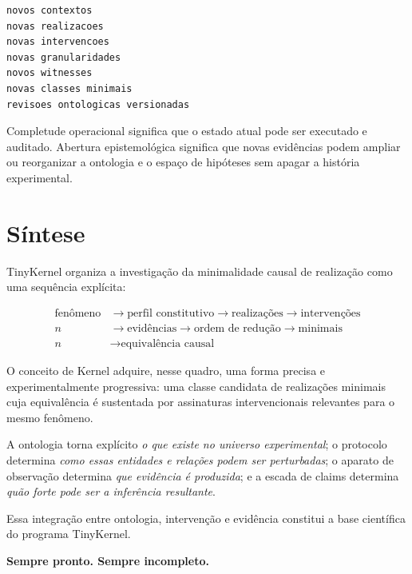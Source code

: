 \documentclass[11pt,a4paper]{article}
\begin{document}
\begin{lstlisting}
novos contextos
novas realizacoes
novas intervencoes
novas granularidades
novos witnesses
novas classes minimais
revisoes ontologicas versionadas
\end{lstlisting}

\begin{thesisbox}
Completude operacional significa que o estado atual pode ser executado e auditado.
Abertura epistemológica significa que novas evidências podem ampliar ou reorganizar a
ontologia e o espaço de hipóteses sem apagar a história experimental.
\end{thesisbox}

\section{Síntese}

TinyKernel organiza a investigação da minimalidade causal de realização como uma
sequência explícita:

\[
\boxed{
\begin{aligned}
\text{fenômeno} &\rightarrow \text{perfil constitutivo} \rightarrow \text{realizações} \rightarrow \text{intervenções} \\n&\rightarrow \text{evidências} \rightarrow \text{ordem de redução} \rightarrow \text{minimais} \\n&\rightarrow \text{equivalência causal}
\end{aligned}
}
\]

O conceito de Kernel adquire, nesse quadro, uma forma precisa e experimentalmente
progressiva: uma classe candidata de realizações minimais cuja equivalência é
sustentada por assinaturas intervencionais relevantes para o mesmo fenômeno.

A ontologia torna explícito \emph{o que existe no universo experimental}; o protocolo
determina \emph{como essas entidades e relações podem ser perturbadas}; o aparato de
observação determina \emph{que evidência é produzida}; e a escada de claims determina
\emph{quão forte pode ser a inferência resultante}.

Essa integração entre ontologia, intervenção e evidência constitui a base científica
do programa TinyKernel.

\vspace{0.8cm}

\begin{center}
{\sffamily\Large\bfseries\color{TKBlue}
Sempre pronto. Sempre incompleto.}
\end{center}
\end{document}
